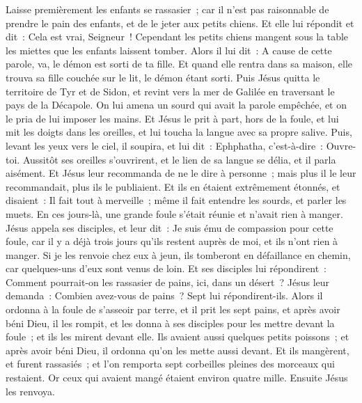 \begin{multicols}{2}
Laisse premièrement les enfants se rassasier~; car il n'est pas raisonnable de prendre le pain des enfants, et de le jeter aux petits chiens.
Et elle lui répondit et dit~: Cela est vrai, Seigneur~! Cependant les petits chiens mangent sous la table les miettes que les enfants laissent tomber.
Alors il lui dit~: A cause de cette parole, va, le démon est sorti de ta fille.
Et quand elle rentra dans sa maison, elle trouva sa fille couchée sur le lit, le démon étant sorti.
Puis Jésus quitta le territoire de Tyr et de Sidon, et revint vers la mer de Galilée en traversant le pays de la Décapole.
On lui amena un sourd qui avait la parole empêchée, et on le pria de lui imposer les mains.
Et Jésus le prit à part, hors de la foule, et lui mit les doigts dans les oreilles, et lui toucha la langue avec sa propre salive.
Puis, levant les yeux vers le ciel, il soupira, et lui dit~: Ephphatha, c'est-à-dire~: Ouvre-toi.
Aussitôt ses oreilles s'ouvrirent, et le lien de sa langue se délia, et il parla aisément.
Et Jésus leur recommanda de ne le dire à personne~; mais plus il le leur recommandait, plus ils le publiaient.
Et ils en étaient extrêmement étonnés, et disaient~: Il fait tout à merveille~; même il fait entendre les sourds, et parler les muets.
\VerseOne{}En ces jours-là, une grande foule s'était réunie et n'avait rien à manger. Jésus appela ses disciples, et leur dit~:
Je suis ému de compassion pour cette foule, car il y a déjà trois jours qu'ils restent auprès de moi, et ils n'ont rien à manger.
Si je les renvoie chez eux à jeun, ils tomberont en défaillance en chemin, car quelques-uns d'eux sont venus de loin.
Et ses disciples lui répondirent~: Comment pourrait-on les rassasier de pains, ici, dans un désert~?
Jésus leur demanda~: Combien avez-vous de pains~? Sept lui répondirent-ils.
Alors il ordonna à la foule de s'asseoir par terre, et il prit les sept pains, et après avoir béni Dieu, il les rompit, et les donna à ses disciples pour les mettre devant la foule~; et ils les mirent devant elle.
Ils avaient aussi quelques petits poissons~; et après avoir béni Dieu, il ordonna qu'on les mette aussi devant.
Et ils mangèrent, et furent rassasiés~; et l'on remporta sept corbeilles pleines des morceaux qui restaient.
Or ceux qui avaient mangé étaient environ quatre mille. Ensuite Jésus les renvoya.

\end{multicols}
